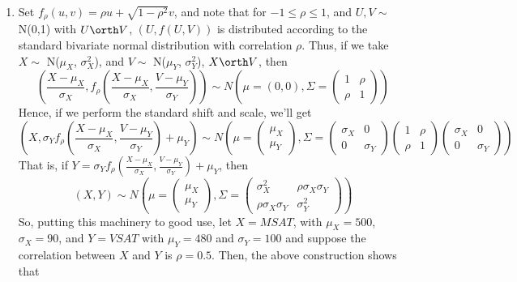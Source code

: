 \documentclass[12pt,titlepage]{article}\usepackage{graphicx, color}
\begin{document}
\begin{enumerate}
\item Set $f_{\rho}(u,v) = \rho u + \sqrt{1-\rho^2} v$, and note that for $-1\leq \rho \leq 1$, and $U, V \sim$ N(0,1) with $U \orth V$, $(U, f(U,V))$ is distributed according to the standard bivariate normal distribution with correlation $\rho$. Thus, if we take $X \sim$ N($\mu_{X}$, $\sigma_{X}^{2}$), and $V \sim$ N($\mu_{Y}$, $\sigma_{Y}^{2}$), $X \orth V$, then 
\[
\left(\frac{X-\mu_{X}}{\sigma_{X}}, f_{\rho}\left(\frac{X-\mu_{X}}{\sigma_{X}}, \frac{V-\mu_{Y}}{\sigma_{Y}}\right) \right) \sim N\left(\mu=(0,0), \Sigma=
\begin{pmatrix}
1 & \rho \\
\rho & 1 
\end{pmatrix}
\right)
\]
Hence, if we perform the standard shift and scale, we'll get
\[
\left(X, \sigma_{Y} f_{\rho}\left(\frac{X-\mu_{X}}{\sigma_{X}}, \frac{V-\mu_{Y}}{\sigma_{Y}}\right) + \mu_{Y} \right) \sim N\left(
\mu=
\begin{pmatrix}
\mu_{X} \\ \mu_{Y}
\end{pmatrix}, \Sigma = 
\begin{pmatrix} 
\sigma_{X} & 0 \\
0 & \sigma_{Y}
\end{pmatrix} 
\begin{pmatrix}
1 & \rho \\
\rho & 1 
\end{pmatrix}
\begin{pmatrix} 
\sigma_{X} & 0 \\
0 & \sigma_{Y}
\end{pmatrix}
\right)
\]
That is, if $Y = \sigma_{Y}f_{\rho}\left(\frac{X-\mu_{X}}{\sigma_{X}}, \frac{V-\mu_{Y}}{\sigma_{Y}}\right) + \mu_{Y} $, then
\[
(X,Y) \sim N\left(
\mu=
\begin{pmatrix}
\mu_{X} \\ \mu_{Y}
\end{pmatrix}, \Sigma = 
\begin{pmatrix} 
\sigma_{X}^{2} & \rho \sigma_{X} \sigma_{Y} \\
\rho \sigma_{X} \sigma_{Y} & \sigma_{Y}^{2}
\end{pmatrix}
\right)
\]
So, putting this machinery to good use, let $X = MSAT$, with $\mu_{X} = 500$, $\sigma_{X} = 90$, and $Y = VSAT$ with $\mu_{Y} = 480$ and $\sigma_{Y} = 100$ and suppose the correlation between $X$ and $Y$ is $\rho = 0.5$. Then, the above construction shows that 
\begin{align*}

\end{align*}
\end{enumerate}
\end{document}
